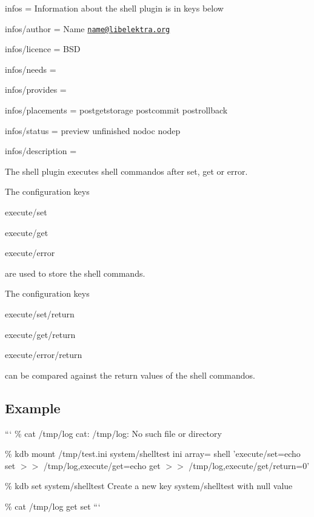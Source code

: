 
\begin{DoxyItemize}
\item infos = Information about the shell plugin is in keys below
\item infos/author = Name \href{mailto:name@libelektra.org}{\tt name@libelektra.\+org}
\item infos/licence = B\+S\+D
\item infos/needs =
\item infos/provides =
\item infos/placements = postgetstorage postcommit postrollback
\item infos/status = preview unfinished nodoc nodep
\item infos/description =
\end{DoxyItemize}

The shell plugin executes shell commandos after set, get or error.

The configuration keys


\begin{DoxyItemize}
\item {\ttfamily execute/set}
\item {\ttfamily execute/get}
\item {\ttfamily execute/error}
\end{DoxyItemize}

are used to store the shell commands.

The configuration keys


\begin{DoxyItemize}
\item {\ttfamily execute/set/return}
\item {\ttfamily execute/get/return}
\item {\ttfamily execute/error/return}
\end{DoxyItemize}

can be compared against the return values of the shell commandos.

\subsection*{Example}

``` \% cat /tmp/log cat\+: /tmp/log\+: No such file or directory

\% kdb mount /tmp/test.ini system/shelltest ini array= shell 'execute/set=echo set $>$$>$ /tmp/log,execute/get=echo get $>$$>$ /tmp/log,execute/get/return=0'

\% kdb set system/shelltest Create a new key system/shelltest with null value

\% cat /tmp/log get set ``` 